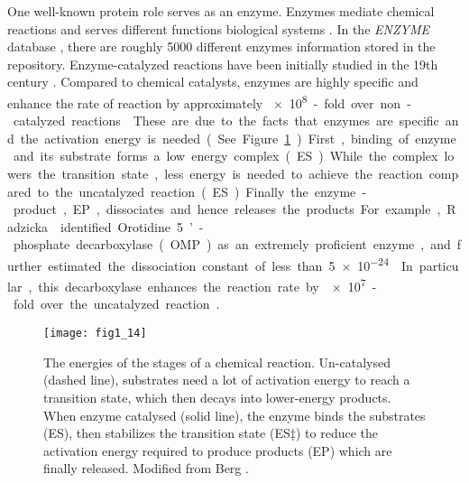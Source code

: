 \begin{refsection}
One well-known protein role serves as an enzyme. Enzymes mediate chemical
reactions and serves different functions biological
systems \cite{AthelCornish-Bowden2012,Stryer1995,Radzicka1995a}. In the
\emph{ENZYME} database \cite{Schomburg2004}, there are roughly 5000 different
enzymes information stored in the repository.  Enzyme-catalyzed reactions have
been initially studied in the 19th century \cite{AthelCornish-Bowden2012}.
Compared to chemical catalysts, enzymes are highly specific and enhance the
rate of reaction by approximately \SI{e8}-fold over non-catalyzed reactions
\cite{Stryer1995}. These are due to the facts that enzymes are specific and the
activation energy is needed (See Figure \ref{fig:enzyme-intro}). First, binding
of enzyme and its substrate forms a low energy complex (ES).  While the complex
lowers the transition state, less energy is needed to achieve the reaction
compared to the uncatalyzed reaction (ES).  Finally the enzyme-product, EP,
dissociates and hence releases the products. For example, Radzicka 
identified Orotidine 5\rq-phosphate decarboxylase (OMP) as an extremely
proficient enzyme, and further estimated the dissociation constant of less than
\SI{5e-24}{\Molar} \cite{Radzicka1995a}.In particular, this decarboxylase
enhances the reaction rate by \SI{e7}-fold over the uncatalyzed
reaction\cite{Radzicka1995a}. 
\begin{figure}[htbp] 
    \centering \texttt{[image: fig1\_14]}
    \caption[The energies of the stages of a chemical reaction. Uncatalysed
    (dashed line), substrates need a lot of activation energy to reach a
transition state, which then decays into lower-energy products. When enzyme
catalysed (solid line), the enzyme binds the substrates (ES), then stabilizes
the transition state (ES‡) to reduce the activation energy required to produce
products (EP) which are finally released.]{The energies of the stages of a
    chemical reaction. Un-catalysed (dashed line), substrates need a lot of
    activation energy to reach a transition state, which then decays into
    lower-energy products. When enzyme catalysed (solid line), the enzyme binds
    the substrates (ES), then stabilizes the transition state (ES‡) to reduce
    the activation energy required to produce products (EP) which are finally
    released. Modified from Berg  \cite{Berg2002}.} 
    \label{fig:enzyme-intro}
\end{figure}


\end{refsection}
